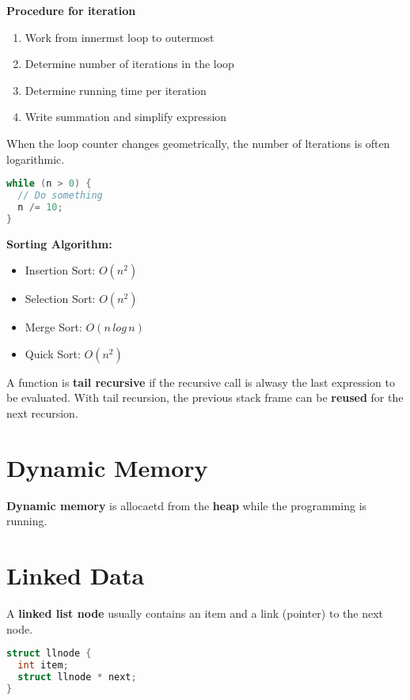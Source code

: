 \documentclass[english, 12pt]{article}
\begin{document}
\begin{mthd}
\textbf{Procedure for iteration}
\begin{enumerate}
\item Work from innermst loop to outermost
\item Determine number of iterations in the loop
\item Determine running time per iteration
\item Write summation and simplify expression
\end{enumerate}
\end{mthd}

\begin{note}
When the loop counter changes geometrically, the number of lterations is often logarithmic.
\begin{lstlisting}[language=C]
while (n > 0) {
  // Do something
  n /= 10;
}
\end{lstlisting}
\end{note}

\begin{exmp}
\textbf{Sorting Algorithm:}
\begin{itemize}
\item Insertion Sort: $O(n^2)$
\item Selection Sort: $O(n^2)$
\item Merge Sort: $O(n\,log\,n)$
\item Quick Sort: $O(n^2)$
\end{itemize}
\end{exmp}

\begin{defn}
A function is \textbf{tail recursive} if the recursive call is alwasy the last expression to be evaluated. With tail recursion, the previous stack frame can be \textbf{reused} for the next recursion.
\end{defn}

\section{Dynamic Memory}

\begin{defn}
\textbf{Dynamic memory} is allocaetd from the \textbf{heap} while the programming is running.
\end{defn}

\section{Linked Data}

\begin{defn}
A \textbf{linked list node} usually contains an item and a link (pointer) to the next node.
\begin{lstlisting}[language=C]
struct llnode {
  int item;
  struct llnode * next;
}
\end{lstlisting}
\end{defn}
\end{document}
